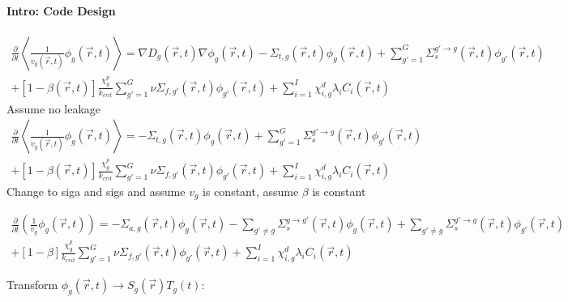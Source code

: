 \documentclass[12pt]{report}
\begin{document}
	
	
	\maketitle
	
	\paragraph{Intro: Code Design}

	\begin{eqnarray}
	\frac{\partial}{\partial t} \left\langle \frac{1}{v_g(\vec{r},t)} \phi_g(\vec{r},t) \right\rangle = \nabla D_g(\vec{r},t) \nabla \phi_g(\vec{r},t) - \Sigma_{t,g}(\vec{r},t) \phi_g(\vec{r},t) + \sum_{g'=1}^{G} \Sigma_{s}^{g'\rightarrow g} (\vec{r},t) \phi_{g'}(\vec{r},t) \nonumber \\ 
	+ \left[ 1- \beta(\vec{r},t) \right] \frac{\chi_g^p}{k_{crit}} \sum_{g'=1}^{G} \nu \Sigma_{f,g'}(\vec{r},t) \phi_{g'}(\vec{r},t) + \sum_{i=1}^{I} \chi_{i,g}^d \lambda_i C_i(\vec{r},t) \nonumber
	\end{eqnarray}
	Assume no leakage
		\begin{eqnarray}
		\frac{\partial}{\partial t} \left\langle \frac{1}{v_g(\vec{r},t)} \phi_g(\vec{r},t) \right\rangle = - \Sigma_{t,g}(\vec{r},t) \phi_g(\vec{r},t) + \sum_{g'=1}^{G} \Sigma_{s}^{g'\rightarrow g} (\vec{r},t) \phi_{g'}(\vec{r},t) \nonumber \\ 
		+ \left[ 1- \beta(\vec{r},t) \right] \frac{\chi_g^p}{k_{crit}} \sum_{g'=1}^{G} \nu \Sigma_{f,g'}(\vec{r},t) \phi_{g'}(\vec{r},t) + \sum_{i=1}^{I} \chi_{i,g}^d \lambda_i C_i(\vec{r},t) \nonumber
		\end{eqnarray}
	Change to siga and sigs	and assume $v_g$ is constant, assume $\beta$ is constant
	
	\begin{eqnarray}
	\frac{\partial}{\partial t} \left( \frac{1}{v_g} \phi_g(\vec{r},t) \right) = - \Sigma_{a,g}(\vec{r},t) \phi_g(\vec{r},t) - \sum_{g'\neq g} \Sigma_{s}^{g\rightarrow g'} (\vec{r},t) \phi_{g}(\vec{r},t) + \sum_{g' \neq g} \Sigma_{s}^{g'\rightarrow g} (\vec{r},t) \phi_{g'}(\vec{r},t) \nonumber \\ 
	+ \left[ 1- \beta \right] \frac{\chi_g^p}{k_{crit}} \sum_{g'=1}^{G} \nu \Sigma_{f,g'}(\vec{r},t) \phi_{g'}(\vec{r},t) + \sum_{i=1}^{I} \chi_{i,g}^d \lambda_i C_i(\vec{r},t) \nonumber
	\end{eqnarray}
	
	Transform $\phi_g(\vec{r},t) \rightarrow S_g(\vec{r}) T_g(t)$:
	
\end{document}
